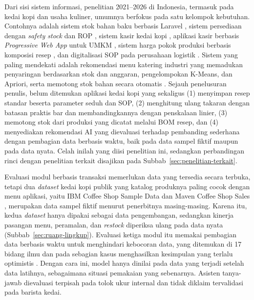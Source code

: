 Dari sisi sistem informasi, penelitian 2021--2026 di Indonesia, termasuk pada kedai kopi dan usaha kuliner, umumnya berfokus pada satu kelompok kebutuhan. Contohnya adalah sistem stok bahan baku berbasis Laravel \citep*{abdur2026sistem}, sistem persediaan dengan \textit{safety stock} dan ROP \citep*{taufiq2025implementation}, sistem kasir kedai kopi \citep*{rusmara2025pengembangan}, aplikasi kasir berbasis \textit{Progressive Web App} untuk UMKM \citep*{prayudha2024rancang}, sistem harga pokok produksi berbasis komposisi resep \citep*{kartono2025perancangan}, dan digitalisasi SOP pada perusahaan logistik \citep*{shabrina2026sistem}. Sistem yang paling mendekati adalah rekomendasi menu katering industri yang memadukan penyaringan berdasarkan stok dan anggaran, pengelompokan K-Means, dan Apriori, serta memotong stok bahan secara otomatis \citep*{pratama2026automatic}. Sejauh penelusuran penulis, belum ditemukan aplikasi kedai kopi yang sekaligus (1) menyimpan resep standar beserta parameter seduh dan SOP, (2) menghitung ulang takaran dengan batasan praktis bar dan membandingkannya dengan penskalaan linier, (3) memotong stok dari produksi yang dicatat melalui BOM resep, dan (4) menyediakan rekomendasi AI yang dievaluasi terhadap pembanding sederhana dengan pembagian data berbasis waktu, baik pada data sampel fiktif maupun pada data nyata. Celah inilah yang diisi penelitian ini, sedangkan perbandingan rinci dengan penelitian terkait disajikan pada Subbab~\ref{sec:penelitian-terkait}.

Evaluasi modul berbasis transaksi memerlukan data yang tersedia secara terbuka, tetapi dua \textit{dataset} kedai kopi publik yang katalog produknya paling cocok dengan menu aplikasi, yaitu IBM Coffee Shop Sample Data \citep*{chang2019coffee} dan Maven Coffee Shop Sales \citep*{mavenanalytics2023coffee}, merupakan data sampel fiktif menurut penerbitnya masing-masing. Karena itu, kedua \textit{dataset} hanya dipakai sebagai data pengembangan, sedangkan kinerja pasangan menu, peramalan, dan \textit{restock} diperiksa ulang pada data nyata (Subbab~\ref{sec:ruang-lingkup}). Evaluasi ketiga modul itu memakai pembagian data berbasis waktu untuk menghindari kebocoran data, yang ditemukan di 17 bidang ilmu dan pada sebagian kasus menghasilkan kesimpulan yang terlalu optimistis \citep*{kapoor2023leakage}. Dengan cara ini, model hanya dinilai pada data yang terjadi setelah data latihnya, sebagaimana situasi pemakaian yang sebenarnya. Asisten tanya-jawab dievaluasi terpisah pada tolok ukur internal dan tidak diklaim tervalidasi pada barista kedai.

